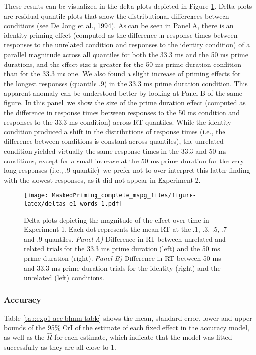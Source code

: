 \documentclass[
  english,
  man,floatsintext]{apa6}
\begin{document}
These results can be visualized in the delta plots depicted in Figure \ref{fig:deltas-e1-words}. Delta plots are residual quantile plots that show the distributional differences between conditions (see De Jong et al., 1994). As can be seen in Panel A, there is an identity priming effect (computed as the difference in response times between responses to the unrelated condition and responses to the identity condition) of a parallel magnitude across all quantiles for both the 33.3 ms and the 50 ms prime durations, and the effect size is greater for the 50 ms prime duration condition than for the 33.3 ms one. We also found a slight increase of priming effects for the longest responses (quantile .9) in the 33.3 ms prime duration condition. This apparent anomaly can be understood better by looking at Panel B of the same figure. In this panel, we show the size of the prime duration effect (computed as the difference in response times between responses to the 50 ms condition and responses to the 33.3 ms condition) across RT quantiles. While the identity condition produced a shift in the distributions of response times (i.e., the difference between conditions is constant across quantiles), the unrelated condition yielded virtually the same response times in the 33.3 and 50 ms conditions, except for a small increase at the 50 ms prime duration for the very long responses (i.e., .9 quantile)--we prefer not to over-interpret this latter finding with the slowest responses, as it did not appear in Experiment 2.

\begin{figure}
\centering
\texttt{[image: MaskedPriming\_complete\_mspg\_files/figure-latex/deltas-e1-words-1.pdf]}
\caption{\label{fig:deltas-e1-words}Delta plots depicting the magnitude of the effect over time in Experiment 1. Each dot represents the mean RT at the .1, .3, .5, .7 and .9 quantiles. \emph{Panel A)} Difference in RT between unrelated and related trials for the 33.3 ms prime duration (left) and the 50 ms prime duration (right). \emph{Panel B)} Difference in RT between 50 ms and 33.3 ms prime duration trials for the identity (right) and the unrelated (left) conditions.}
\end{figure}

\hypertarget{accuracy}{%
\subsubsection{Accuracy}\label{accuracy}}

Table \ref{tab:exp1-acc-blmm-table} shows the mean, standard error, lower and upper bounds of the 95\% CrI of the estimate of each fixed effect in the accuracy model, as well as the \(\hat{R}\) for each estimate, which indicate that the model was fitted successfully as they are all close to 1.
\end{document}
